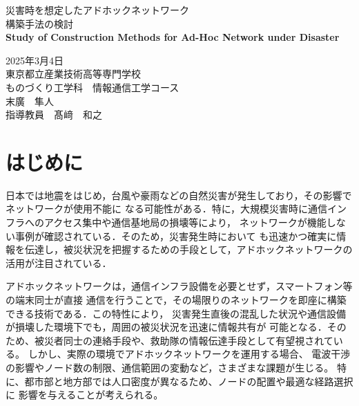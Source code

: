 \documentclass[a4paper, 11pt]{ltjsarticle}
\begin{document}
\fontsize{11pt}{14pt}\selectfont

\thispagestyle{empty}
\begin{center}

\vspace*{40mm}
{\huge\noindent 災害時を想定したアドホックネットワーク}\\
\medskip
{\huge\noindent 構築手法の検討}\\
\vspace{\baselineskip}
{\huge\noindent\textbf{Study of Construction Methods for Ad-Hoc Network under Disaster}}\\
\vspace{120mm}

{\huge\noindent
2025年3月4日\\
東京都立産業技術高等専門学校\\
ものづくり工学科　情報通信工学コース \\
末廣　隼人\\
指導教員　髙﨑　和之    \\
}
\vspace{40mm}

\end{center}

\clearpage  %
\thispagestyle{empty}
\tableofcontents  %

\clearpage
{}
\section{はじめに}
日本では地震をはじめ，台風や豪雨などの自然災害が発生しており，その影響でネットワークが使用不能に
なる可能性がある．特に，大規模災害時に通信インフラへのアクセス集中や通信基地局の損壊等により，
ネットワークが機能しない事例が確認されている\cite{通信インフラ被害}．そのため，災害発生時において
も迅速かつ確実に情報を伝達し，被災状況を把握するための手段として，アドホックネットワークの
活用が注目されている．

アドホックネットワークは，通信インフラ設備を必要とせず，スマートフォン等の端末同士が直接
通信を行うことで，その場限りのネットワークを即座に構築できる技術である．この特性により，
災害発生直後の混乱した状況や通信設備が損壊した環境下でも，周囲の被災状況を迅速に情報共有が
可能となる．そのため、被災者同士の連絡手段や、救助隊の情報伝達手段として有望視されている。
しかし、実際の環境でアドホックネットワークを運用する場合、
電波干渉の影響やノード数の制限、通信範囲の変動など，さまざまな課題が生じる。
特に、都市部と地方部では人口密度が異なるため、ノードの配置や最適な経路選択に
影響を与えることが考えられる。
\end{document}

